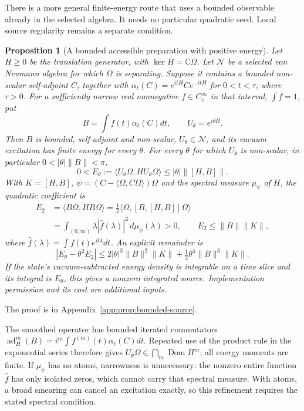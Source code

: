 \documentclass[12pt]{article}
\newtheorem{proposition}[theorem]{Proposition}
\theoremstyle{definition}
\theoremstyle{remark}
\begin{document}
There is a more general finite-energy route that uses a bounded observable already
in the selected algebra. It needs no particular quadratic seed. Local source
regularity remains a separate condition.

\begin{proposition}[A bounded accessible preparation with positive energy]
\label{prop:bounded-source}
Let \(H\ge0\) be the translation generator, with
\(\ker H=\mathbb C\Omega\). Let \(\mathcal N\) be a selected von Neumann algebra
for which \(\Omega\) is separating. Suppose it contains a bounded non-scalar
self-adjoint \(C\), together with \(\alpha_t(C)=e^{itH}Ce^{-itH}\) for
\(0<t<\tau\), where \(\tau>0\). For a sufficiently narrow real nonnegative
\(f\in C_c^\infty\) in that interval, \(\int f=1\), put
\[
 B=\int f(t)\alpha_t(C)dt,\qquad U_\theta=e^{i\theta B}.
\]
Then \(B\) is bounded, self-adjoint and non-scalar, \(U_\theta\in\mathcal N\),
and its vacuum excitation has finite energy for every \(\theta\). For every
\(\theta\) for which \(U_\theta\) is non-scalar, in particular
\(0<|\theta|\|B\|<\pi\),
\[
 0<E_\theta:=\langle U_\theta\Omega,H U_\theta\Omega\rangle
 \le|\theta|\|[H,B]\|.
\]
With \(K=[H,B]\), \(\psi=(C-\langle\Omega,C\Omega\rangle)\Omega\) and the
spectral measure \(\mu_\psi\) of \(H\), the quadratic coefficient is
\begin{align}
 E_2&=\langle B\Omega,HB\Omega\rangle
 =\tfrac12\langle\Omega,[B,[H,B]]\Omega\rangle\nonumber\\
 &=\int_{(0,\infty)}\lambda|\widehat f(\lambda)|^2\,d\mu_\psi(\lambda)>0,
 \qquad E_2\le\|B\|\|K\|, \label{eq:bounded-energy}
\end{align}
where \(\widehat f(\lambda)=\int f(t)e^{it\lambda}dt\). An explicit remainder is
\[
 |E_\theta-\theta^2E_2|
 \le2|\theta|^3\|B\|^2\|K\|
       +\tfrac12\theta^4\|B\|^3\|K\|.
\]
If the state's vacuum-subtracted energy density is integrable on a time slice
and its integral is \(E_\theta\), this gives a nonzero integrated source.
Implementation permission and its cost are additional inputs.
\end{proposition}
The proof is in Appendix~\ref{app:prop:bounded-source}.


The smoothed operator has bounded iterated commutators
\(\operatorname{ad}_H^m(B)=i^m\int f^{(m)}(t)\alpha_t(C)dt\).
Repeated use of the product rule in the exponential series therefore gives
\(U_\theta\Omega\in\bigcap_m\operatorname{Dom}H^m\); all energy moments are
finite. If \(\mu_\psi\) has no atoms, narrowness is unnecessary: the nonzero
entire function \(\widehat f\) has only isolated zeros, which cannot carry
that spectral measure. With atoms, a broad smearing can cancel an excitation
exactly, so this refinement requires the stated spectral condition.
\end{document}

